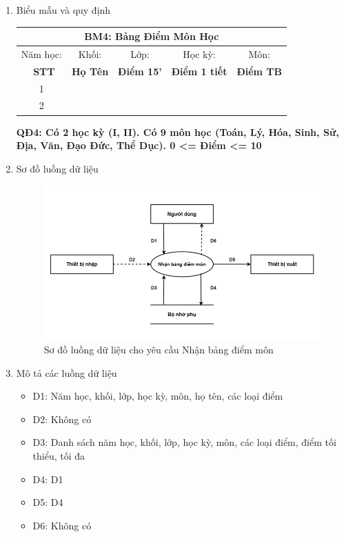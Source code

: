 \documentclass[a4paper]{article}
\begin{document}
	\begin{enumerate}[label=\alph*.]
\item Biểu mẫu và quy định

\begin{table}[H]
    \centering
    \renewcommand{\arraystretch}{1.5}
    \setlength{\tabcolsep}{12pt} %
    \begin{tabular}{|c|c|c|c|c|}
    \hline
    \multicolumn{5}{|c|}{\textbf{BM4: Bảng Điểm Môn Học}} \\  
    \hline
    Năm học: & Khối: & Lớp: & Học kỳ:  & Môn:  \\  
    \hline
   \
    \textbf{STT} & \textbf{Họ Tên} & \textbf{Điểm 15'} & \textbf{Điểm 1 tiết} & \textbf{Điểm TB} \\  
    \hline
    1 & & & & \\  
    \hline
    2 & & & & \\  
    \hline
    \end{tabular}
\end{table}

\textbf{QĐ4: Có 2 học kỳ (I, II). Có 9 môn học (Toán, Lý, Hóa, Sinh, Sử, Địa, Văn, Đạo Đức, Thể Dục). 0 <= Điểm <= 10}

\item Sơ đồ luồng dữ liệu
\begin{figure}[H] 
    \centering
    \includegraphics[width=1\textwidth]{dfd4} %
    \caption{Sơ đồ luồng dữ liệu cho yêu cầu Nhận bảng điểm môn }
    \label{fig:example} %
\end{figure}	
\item Mô tả các luồng dữ liệu
\begin{itemize}
\item D1: Năm học, khối, lớp, học kỳ, môn, họ tên, các loại điểm
\item D2: Không có
\item D3: Danh sách năm học, khối, lớp, học kỳ, môn, các loại điểm, điểm tối thiểu, tối đa
\item D4: D1
\item D5: D4
\item D6: Không có
\end{itemize}



\end{enumerate}
\end{document}

